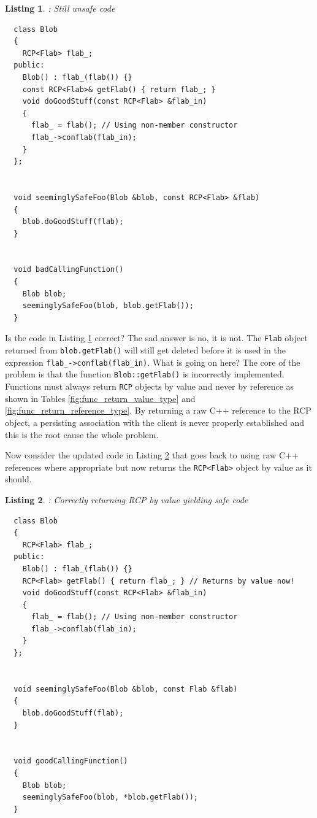 \documentclass[pdf,ps2pdf,11pt]{SANDreport}
\newtheorem{listing}{Listing}
\begin{document}
\begin{listing}: Still unsafe code  \\
\label{listing:unsafe_raw_C++_reference3}
{\small\begin{verbatim}
  class Blob
  {
    RCP<Flab> flab_;
  public:
    Blob() : flab_(flab()) {}
    const RCP<Flab>& getFlab() { return flab_; }
    void doGoodStuff(const RCP<Flab> &flab_in)
    {
      flab_ = flab(); // Using non-member constructor
      flab_->conflab(flab_in);
    }
  };


  void seeminglySafeFoo(Blob &blob, const RCP<Flab> &flab)
  {
    blob.doGoodStuff(flab);
  }


  void badCallingFunction()
  {
    Blob blob;
    seeminglySafeFoo(blob, blob.getFlab());
  }
\end{verbatim}}
\end{listing}

Is the code in Listing {}\ref{listing:unsafe_raw_C++_reference3}
correct?  The sad answer is no, it is not.  The {}\texttt{Flab} object
returned from {}\texttt{blob.getFlab()} will still get deleted before
it is used in the expression {}\texttt{flab\_->conflab(flab\_in)}.
What is going on here?  The core of the problem is that the function
{}\texttt{Blob::getFlab()} is incorrectly implemented.  Functions must
always return {}\texttt{RCP} objects by value and never by reference
as shown in Tables {}\ref{fig:func_return_value_type} and
{}\ref{fig:func_return_reference_type}.  By returning a raw C++
reference to the RCP object, a persisting association with the client
is never properly established and this is the root cause the whole
problem.

Now consider the updated code in Listing
{}\ref{listing:safe_raw_C++_reference3} that goes back to using raw
C++ references where appropriate but now returns the
{}\texttt{RCP<Flab>} object by value as it should.

\begin{listing}: Correctly returning RCP by value yielding safe code \\
\label{listing:safe_raw_C++_reference3}
{\small\begin{verbatim}
  class Blob
  {
    RCP<Flab> flab_;
  public:
    Blob() : flab_(flab()) {}
    RCP<Flab> getFlab() { return flab_; } // Returns by value now!
    void doGoodStuff(const RCP<Flab> &flab_in)
    {
      flab_ = flab(); // Using non-member constructor
      flab_->conflab(flab_in);
    }
  };


  void seeminglySafeFoo(Blob &blob, const Flab &flab)
  {
    blob.doGoodStuff(flab);
  }


  void goodCallingFunction()
  {
    Blob blob;
    seeminglySafeFoo(blob, *blob.getFlab());
  }
\end{verbatim}}
\end{listing}
\end{document}
